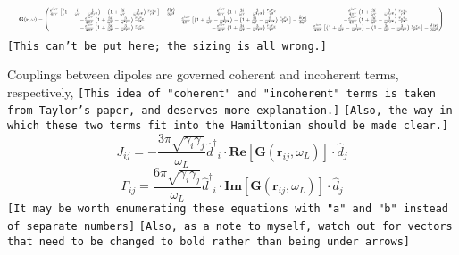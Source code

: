 \documentclass[aps,pra,superscriptaddress,twocolumn]{revtex4-1}
\newcommand{\commentSB}[1]{\texttt{\color{blue}[#1]}}
\begin{document}
\begin{equation} \resizebox{1.0\hsize}{!}{
    $ \textbf{G}(\textbf{r},\omega) = \begin{pmatrix}
        \frac{e^{i\omega r}}{4\pi r} \left[ \left( 1 + \frac{i}{\omega r} - \frac{1}{\omega^2 r^2} \right) - \left( 1 + \frac{3i}{\omega r} - \frac{3}{\omega^2 r^2} \right) \frac{r_x r_x}{r^2} \right] - \frac{\delta(\textbf{r})}{3\omega^2}
        & -\frac{e^{i\omega r}}{4\pi r} \left( 1 + \frac{3i}{\omega r} - \frac{3}{\omega^2 r^2} \right) \frac{r_x r_y}{r^2}
        & -\frac{e^{i\omega r}}{4\pi r}  \left( 1 + \frac{3i}{\omega r} - \frac{3}{\omega^2 r^2} \right) \frac{r_x r_z}{r^2}  \\
        - \frac{e^{i\omega r}}{4\pi r} \left( 1 + \frac{3i}{\omega r} - \frac{3}{\omega^2 r^2} \right) \frac{r_y r_x}{r^2}  
        & \frac{e^{i\omega r}}{4\pi r} \left[ \left( 1 + \frac{i}{\omega r} - \frac{1}{\omega^2 r^2} \right) - \left( 1 + \frac{3i}{\omega r} - \frac{3}{\omega^2 r^2} \right) \frac{r_y r_y}{r^2} \right] - \frac{\delta(\textbf{r})}{3\omega^2} 
        & - \frac{e^{i\omega r}}{4\pi r} \left( 1 + \frac{3i}{\omega r} - \frac{3}{\omega^2 r^2} \right) \frac{r_y r_z}{r^2} \\
        - \frac{e^{i\omega r}}{4\pi r} \left( 1 + \frac{3i}{\omega r} - \frac{3}{\omega^2 r^2} \right) \frac{r_z r_x}{r^2} 
        & - \frac{e^{i\omega r}}{4\pi r} \left( 1 + \frac{3i}{\omega r} - \frac{3}{\omega^2 r^2} \right) \frac{r_z r_y}{r^2} 
        & \frac{e^{i\omega r}}{4\pi r} \left[ \left( 1 + \frac{i}{\omega r} - \frac{1}{\omega^2 r^2} \right) - \left( 1 + \frac{3i}{\omega r} - \frac{3}{\omega^2 r^2} \right) \frac{r_z r_z}{r^2} \right] - \frac{\delta(\textbf{r})}{3\omega^2}
    \end{pmatrix} $
    \label{eqn:green}
    }\end{equation}
    \commentSB{This can't be put here; the sizing is all wrong.}

    Couplings between dipoles are governed coherent and incoherent terms, respectively, 
    \commentSB{This idea of "coherent" and "incoherent" terms is taken from Taylor's paper, and deserves more explanation.}
    \commentSB{Also, the way in which these two terms fit into the Hamiltonian should be made clear.}
    \begin{equation} 
        J_{ij} = -\frac{3\pi \sqrt{\gamma_i \gamma_j}}{\omega_L} {\hat{d}^\dagger}_i \cdot \textbf{Re} [\textbf{G}(\textbf{r}_{ij}, \omega_L)] \cdot \hat{d}_j 
        \label{eqn:J}
    \end{equation}
    \begin{equation}
        \Gamma_{ij} = \frac{6\pi \sqrt{\gamma_i \gamma_j}}{\omega_L} {\hat{d}^\dagger}_i \cdot \textbf{Im} [\textbf{G}(\textbf{r}_{ij},\omega_L)] \cdot \hat{d}_j 
        \label{eqn:Gamma}
    \end{equation}
    \commentSB{It may be worth enumerating these equations with "a" and "b" instead of separate numbers}
    \commentSB{Also, as a note to myself, watch out for vectors that need to be changed to bold rather than being under arrows}
\end{document}
